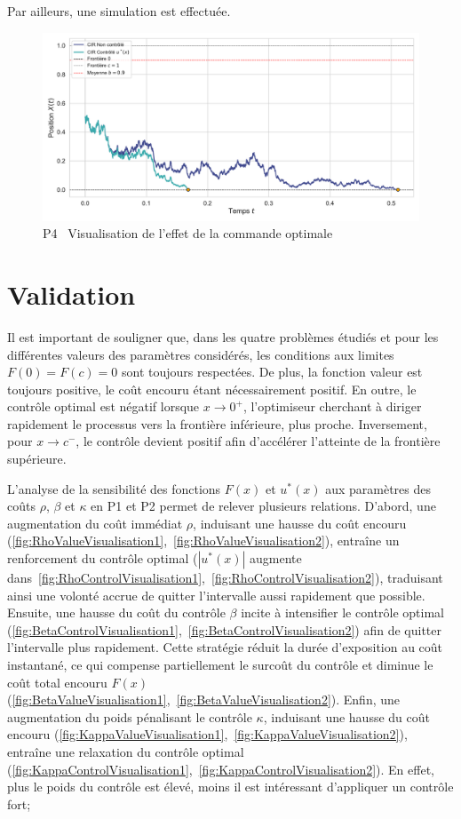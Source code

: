 \FloatBarrier Par ailleurs, une simulation est effectuée. 
\begin{figure}[htb]
    \centering
    \includegraphics[width=0.9\linewidth]{img/validation/P4/p4_control_simulation.pdf}
    \caption{P4 \textemdash~Visualisation de l'effet de la commande optimale}\label{fig:Simulation4}
\end{figure}\FloatBarrier\section{Validation}
Il est important de souligner que, dans les quatre problèmes étudiés et pour les différentes valeurs des paramètres considérés, les conditions aux limites $F(0)=F(c)=0$ sont toujours respectées. De plus, la fonction valeur est toujours positive, le coût encouru étant nécessairement positif. En outre, le contrôle optimal est négatif lorsque \( x \to 0^+ \), l'optimiseur cherchant à diriger rapidement le processus vers la frontière inférieure, plus proche. Inversement, pour \( x \to c^-\), le contrôle devient positif afin d'accélérer l'atteinte de la frontière supérieure. 

L'analyse de la sensibilité des fonctions \(F(x)\) et \(u^*(x)\) aux paramètres des coûts $\rho$, $\beta$ et $\kappa$ en P1 et P2 permet de relever plusieurs relations. D'abord, une augmentation du coût immédiat $\rho$, induisant une hausse du coût encouru (\ref{fig:RhoValueVisualisation1},~\ref{fig:RhoValueVisualisation2}), entraîne un renforcement du contrôle optimal ($|u^*(x)|$ augmente dans~\ref{fig:RhoControlVisualisation1},~\ref{fig:RhoControlVisualisation2}), traduisant ainsi une volonté accrue de quitter l'intervalle aussi rapidement que possible. Ensuite, une hausse du coût du contrôle $\beta$ incite à intensifier le contrôle optimal (\ref{fig:BetaControlVisualisation1},~\ref{fig:BetaControlVisualisation2}) afin de quitter l'intervalle plus rapidement. Cette stratégie réduit la durée d'exposition au coût instantané, ce qui compense partiellement le surcoût du contrôle et diminue le coût total encouru $F(x)$ (\ref{fig:BetaValueVisualisation1},~\ref{fig:BetaValueVisualisation2}). Enfin, une augmentation du poids pénalisant le contrôle $\kappa$, induisant une hausse du coût encouru (\ref{fig:KappaValueVisualisation1},~\ref{fig:KappaValueVisualisation2}), entraîne une relaxation du contrôle optimal (\ref{fig:KappaControlVisualisation1},~\ref{fig:KappaControlVisualisation2}). En effet, plus le poids du contrôle est élevé, moins il est intéressant d'appliquer un contrôle fort;

